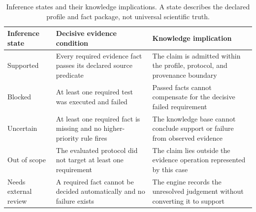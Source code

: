 \begin{table}[t!]
\centering
\caption{Inference states and their knowledge implications. A state describes the declared profile and fact package, not universal scientific truth.}
\label{tab:decision-actions}
\footnotesize
\renewcommand{\arraystretch}{1.15}
\begin{tabularx}{\textwidth}{@{}p{}p{}Y@{}}
\toprule
Inference state & Decisive evidence condition & Knowledge implication \\
\midrule
Supported & Every required evidence fact passes its declared source predicate & The claim is admitted within the profile, protocol, and provenance boundary \\
\addlinespace[3pt]
Blocked & At least one required test was executed and failed & Passed facts cannot compensate for the decisive failed requirement \\
\addlinespace[3pt]
Uncertain & At least one required fact is missing and no higher-priority rule fires & The knowledge base cannot conclude support or failure from observed evidence \\
\addlinespace[3pt]
Out of scope & The evaluated protocol did not target at least one requirement & The claim lies outside the evidence operation represented by this case \\
\addlinespace[3pt]
Needs external review & A required fact cannot be decided automatically and no failure exists & The engine records the unresolved judgement without converting it to support \\
\bottomrule
\end{tabularx}
\end{table}
